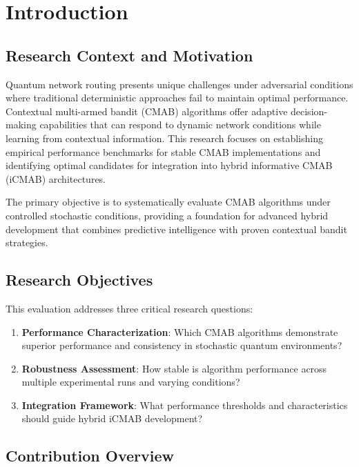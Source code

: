 \documentclass[12pt,a4paper]{article}
\begin{document}
\newpage
\section{Introduction}

\subsection{Research Context and Motivation}

Quantum network routing presents unique challenges under adversarial conditions where traditional deterministic approaches fail to maintain optimal performance. Contextual multi-armed bandit (CMAB) algorithms offer adaptive decision-making capabilities that can respond to dynamic network conditions while learning from contextual information. This research focuses on establishing empirical performance benchmarks for stable CMAB implementations and identifying optimal candidates for integration into hybrid informative CMAB (iCMAB) architectures.

The primary objective is to systematically evaluate CMAB algorithms under controlled stochastic conditions, providing a foundation for advanced hybrid development that combines predictive intelligence with proven contextual bandit strategies.

\subsection{Research Objectives}

This evaluation addresses three critical research questions:

\begin{enumerate}
\item \textbf{Performance Characterization}: Which CMAB algorithms demonstrate superior performance and consistency in stochastic quantum environments?
\item \textbf{Robustness Assessment}: How stable is algorithm performance across multiple experimental runs and varying conditions?
\item \textbf{Integration Framework}: What performance thresholds and characteristics should guide hybrid iCMAB development?
\end{enumerate}

\subsection{Contribution Overview}
\end{document}
